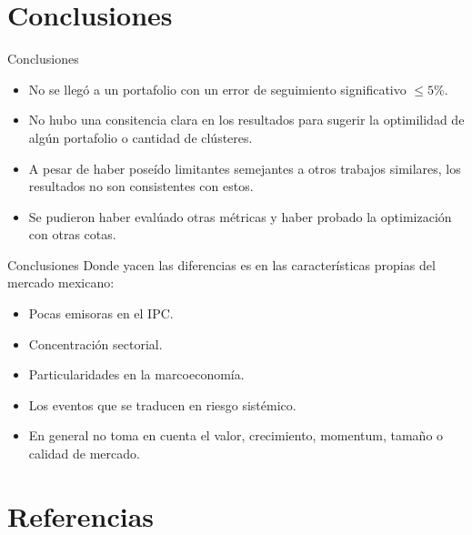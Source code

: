 \documentclass[aspectratio=169,xcolor=dvipsnames]{beamer}
\begin{document}
\section{Conclusiones}
\begin{frame}{Conclusiones}
    \begin{itemize}
        \item No se llegó a un portafolio con un error de seguimiento significativo $\leq 5\%$.
        \item No hubo una consitencia clara en los resultados para sugerir la optimilidad de algún portafolio o cantidad de clústeres.
        \item A pesar de haber poseído limitantes semejantes a otros trabajos similares, los resultados no son consistentes con estos.
        \item Se pudieron haber evalúado otras métricas y haber probado la optimización con otras cotas.
    \end{itemize}
\end{frame}

\begin{frame}{Conclusiones}
    Donde yacen las diferencias es en las características propias del mercado mexicano:
    \begin{itemize}
        \item Pocas emisoras en el IPC.
        \item Concentración sectorial.
        \item Particularidades en la marcoeconomía.
        \item Los eventos que se traducen en riesgo sistémico.
        \item En general no toma en cuenta el valor, crecimiento, momentum, tamaño o calidad de mercado.
    \end{itemize}
\end{frame}
\section{Referencias}
\end{document}
